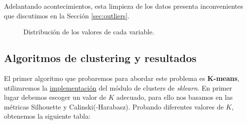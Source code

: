 \documentclass[oneside]{book}
\begin{document}
Adelantando acontecimientos, esta limpieza de los datos presenta
inconvenientes que discutimos en la Sección \ref{sec:outliers}.

\begin{figure}[H]
  \centering
  \caption{Distribución de los valores de cada variable.}
  \label{fig:distrib1-outliers}
\end{figure}

\subsection{Algoritmos de clustering y resultados} \label{sec:alg1}

El primer algoritmo que probaremos para abordar este problema es
\textbf{K-means}, utilizaremos la
\href{https://scikit-learn.org/stable/modules/generated/sklearn.cluster.KMeans.html}{implementación}
del módulo de clusters de \textit{sklearn}. En primer lugar debemos
escoger un valor de $K$ adecuado, para ello nos basamos en las
métricas Silhouette y Calinski(-Harabasz). Probando diferentes valores
de $K$, obtenemos la siguiente tabla:
\end{document}
